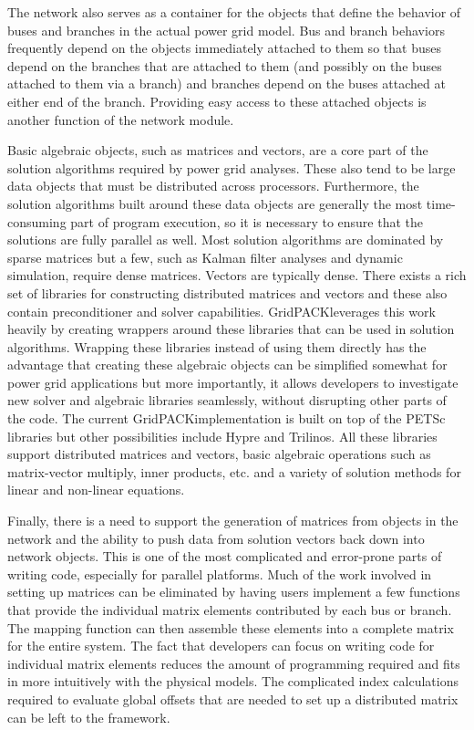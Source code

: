 \documentclass[preprint]{acm_proc_article-sp}
\begin{document}
The network also serves as a container for the objects that define the behavior
of buses and branches in the actual power grid model. Bus and branch behaviors frequently
depend on the objects immediately attached to them so that buses depend on the
branches that are attached to them (and possibly on the buses attached to them
via a branch) and branches depend on the buses attached at either end of the
branch. Providing easy access to these attached objects is another function of the
network module.

Basic algebraic objects, such as matrices and vectors, are a core part
of the solution algorithms required by power grid analyses. These also tend to
be large data objects that must be distributed across processors. Furthermore,
the solution algorithms built around these data objects are generally the most
time-consuming part of program execution, so it is necessary to ensure that the
solutions are fully parallel as well. Most solution algorithms
are dominated by sparse matrices but a few, such as Kalman filter
analyses\cite{KAL} and dynamic simulation\cite{DS}, require dense
matrices. Vectors are typically dense. There exists a rich set of libraries for
constructing distributed matrices and vectors and these also contain preconditioner
and solver capabilities.  GridPACK\texttrademark leverages this work heavily by
creating wrappers around these libraries that can be used in solution
algorithms. Wrapping these libraries instead of using them directly has the
advantage that creating these algebraic objects can be simplified somewhat for power grid
applications but more importantly, it allows developers to investigate new
solver and algebraic libraries seamlessly, without disrupting other parts of the code.
The current GridPACK\texttrademark implementation is built on top of the
PETSc\cite{PETSC}
libraries but other possibilities include Hypre\cite{HYPRE} and
Trilinos\cite{TRIL}. All these
libraries support distributed matrices and vectors, basic algebraic operations
such as matrix-vector multiply, inner products, etc. and a variety of solution
methods for linear and non-linear equations.

Finally, there is a need to support the generation of matrices from objects in the
network and the ability to push data from solution vectors back down into
network objects. This is one of the most complicated and error-prone parts of
writing code, especially for parallel platforms. Much of the work involved in
setting up matrices can be eliminated by having users implement a few functions
that provide the individual matrix elements contributed by each bus or branch. The
mapping function can then assemble these elements into a complete matrix for the
entire system. The fact that developers can focus on writing code for individual
matrix elements reduces the amount of programming required and fits in more
intuitively with the physical models. The complicated index calculations
required to evaluate global offsets that are needed to set up a distributed
matrix can be left to the framework.
\end{document}
